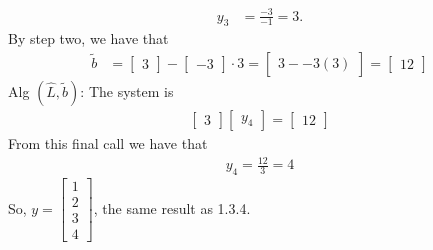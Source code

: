 \documentclass{report}
\begin{document}
    \begin{align*}
        y_{3} &= \frac{-3}{-1} = 3
    .\end{align*}
    By step two, we have that
    \begin{align*}
        \tilde{b} &= \begin{bmatrix} 3 \end{bmatrix} - \begin{bmatrix} -3 \end{bmatrix} \cdot  3 = \begin{bmatrix} 3 - -3(3) \end{bmatrix} = \begin{bmatrix} 12 \end{bmatrix}
    \end{align*}
    Alg $(\hat{L}, \tilde{b})$: The system is 
    \begin{align*}
        \begin{bmatrix} 3 \end{bmatrix} \begin{bmatrix} y_{4} \end{bmatrix} = \begin{bmatrix} 12 \end{bmatrix}
    \end{align*}
    From this final call we have that
    \begin{align*}
        y_{4} = \frac{12}{3} = 4
    \end{align*}
    So, $y = \begin{bmatrix} 1 \\ 2 \\3 \\4 \end{bmatrix} $, the same result as 1.3.4.

    
\end{document}
